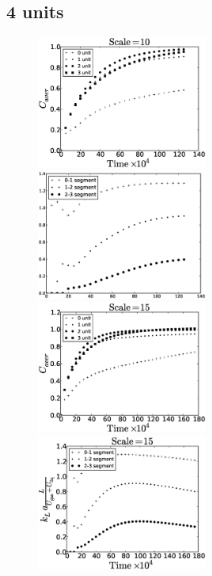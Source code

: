 \documentclass{article}
\begin{document}
\subsection{4 units}
\begin{figure}[htb!]
\includegraphics[width=0.5\textwidth]{Figures/aver_units4scale10.eps}\hfill
\includegraphics[width=0.5\textwidth]{Figures/coeff_units4scale10.eps}\\
\includegraphics[width=0.5\textwidth]{Figures/aver_units4scale15.eps}\hfill
\includegraphics[width=0.5\textwidth]{Figures/coeff_units4scale15.eps}\\

\end{figure}
\end{document}
